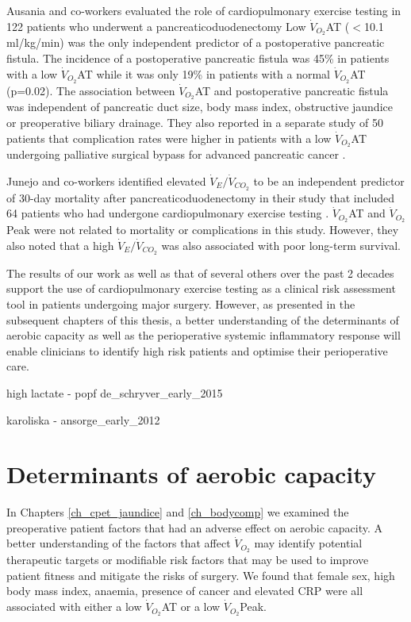 Ausania and co-workers evaluated the role of cardiopulmonary exercise testing in 122 patients who underwent a pancreaticoduodenectomy \parencite{ausania_effects_2012}
Low $\dot{V}_{O_2}$AT ($<$10.1 ml/kg/min) was the only independent predictor of a postoperative pancreatic fistula.
The incidence of a postoperative pancreatic fistula was 45\% in patients with a low $\dot{V}_{O_2}$AT while it was only 19\% in patients with a normal $\dot{V}_{O_2}$AT (p=0.02).
The association between $\dot{V}_{O_2}$AT and postoperative pancreatic fistula was independent of pancreatic duct size, body mass index, obstructive jaundice or preoperative biliary drainage.
They also reported in a separate study of 50 patients that complication  rates were higher in patients with a low $\dot{V}_{O_2}$AT undergoing palliative surgical bypass for advanced pancreatic cancer \parencite{ausania_double_2012}.

Junejo and co-workers identified elevated $\dot{V}_E/\dot{V}_{CO_2}$ to be an independent predictor of 30-day mortality after pancreaticoduodenectomy in their study that included 64 patients who had undergone cardiopulmonary exercise testing \parencite{junejo_cardiopulmonary_2014}.
$\dot{V}_{O_2}$AT and $\dot{V}_{O_2}$Peak  were not related to mortality or complications in this study.
However, they also noted that a high $\dot{V}_E/\dot{V}_{CO_2}$ was also associated with poor long-term survival.



The results of our work as well as that of several others over the past 2 decades support the use of cardiopulmonary exercise testing as a clinical risk assessment tool in patients undergoing major surgery.
However, as presented in the subsequent chapters of this thesis, a better understanding of the determinants of aerobic capacity as well as the perioperative systemic inflammatory response will enable clinicians to identify high risk patients and optimise their perioperative care.

high lactate - popf de_schryver_early_2015

karoliska - ansorge_early_2012


\section{Determinants of aerobic capacity}
In Chapters \ref{ch_cpet_jaundice} and \ref{ch_bodycomp} we examined the preoperative patient factors that had an adverse effect on aerobic capacity.
A better understanding of the factors that affect $\dot{V}_{O_2}$ may identify potential therapeutic targets or modifiable risk factors that may be used to improve patient fitness and mitigate the risks of surgery.
We found that female sex, high body mass index, anaemia, presence of cancer and elevated CRP were all associated with either a low $\dot{V}_{O_2}$AT or a low $\dot{V}_{O_2}$Peak.

